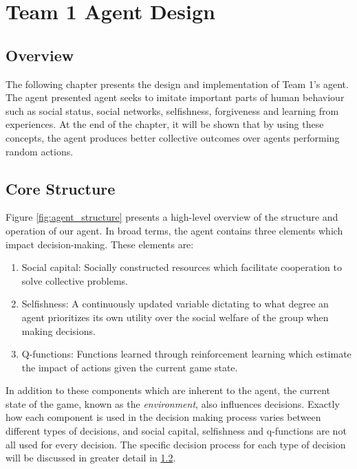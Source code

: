\chapter{Team 1 Agent Design}\label{team_1_agent_design}

\section{Overview}

The following chapter presents the design and implementation of Team 1's agent. The agent presented agent seeks to imitate important parts of human behaviour such as social status, social networks, selfishness, forgiveness and learning from experiences. At the end of the chapter, it will be shown that by using these concepts, the agent produces better collective outcomes over agents performing random actions.

\section{Core Structure}
Figure \ref{fig:agent_structure} presents a high-level overview of the structure and operation of our agent. In broad terms, the agent contains three elements which impact decision-making. These elements are:
\begin{enumerate}
  \item Social capital: Socially constructed resources which facilitate cooperation to solve collective problems.
  \item Selfishness: A continuously updated variable dictating to what degree an  agent prioritizes its own utility over the social welfare of the group when making decisions. 
  \item Q-functions: Functions learned through reinforcement learning which estimate the impact of actions given the current game state.
\end{enumerate}
In addition to these components which are inherent to the agent, the current state of the game, known as the \emph{environment}, also influences decisions. Exactly how each component is used in the decision making process varies between different types of decisions, and social capital, selfishness and q-functions are not all used for every decision. The specific decision process for each type of decision will be discussed in greater detail in \ref{}.


